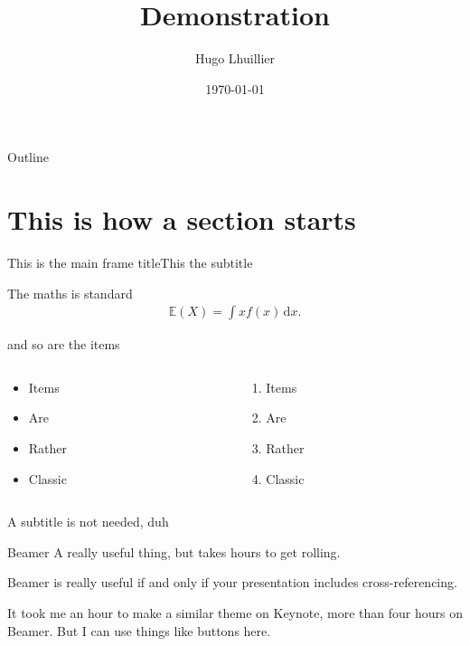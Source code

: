 \documentclass[serif,c,10pt]{beamer}
\title[Demo]{Demonstration}
\date{\today}
\author[H. Lhuillier]{Hugo Lhuillier}
\institute{In my apartment}
\begin{document}
\begin{frame}
	\titlepage
\end{frame}

\begin{frame}{Outline}
	\tableofcontents 
\end{frame}

\section{This is how a section starts}

\begin{frame}{This is the main frame title}{This the subtitle}

	The maths is standard
	\begin{align*}
		\mathbb{E}(X) = \int x f(x) \, \mathrm{d}x.
	\end{align*}
	
	and so are the items

	\begin{columns}[T] %
		\begin{column}{.48\textwidth}
			\begin{itemize}
				\item Items
				\item Are
				\item Rather 
				\item Classic
			\end{itemize}
		\end{column}%
		\hfill%
		\begin{column}{.48\textwidth}
			\begin{enumerate}
				\item Items
				\item Are
				\item Rather 
				\item Classic
			\end{enumerate}
		\end{column}%
	\end{columns}

\end{frame}

\begin{frame}{A subtitle is not needed, duh}\label{frame:previous-page}
	
	\begin{definition-box}{Beamer}{}
		A really useful thing, but takes hours to get rolling.
	\end{definition-box}
	\begin{lemma-box}{}{}
		Beamer is really useful if and only if your presentation includes cross-referencing.
	\end{lemma-box}
	\begin{proof-box}
		It took me an hour to make a similar theme on Keynote, more than four hours on Beamer. But I can use things like buttons here.
	\end{proof-box}

	\hyperlink{frame:next-page}{} 
	
\end{frame}
\end{document}
